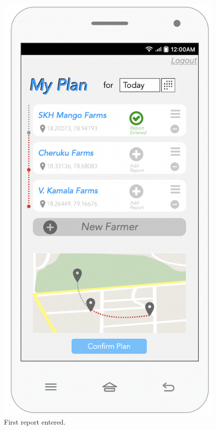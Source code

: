 \begin{multicols}{2}

\begin{figure}[H]
\centering
\includegraphics[scale=0.5]{../images_diagrams/mock_ups/dd/Plan07_OneReport.png}
\caption{\label{fig:mockplan_reportentered}First report entered.}
\end{figure}


\end{multicols}
